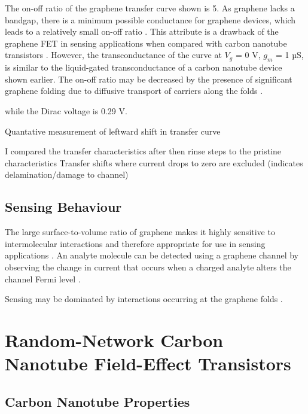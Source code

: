 \documentclass[
  a4paper,
]{scrbook}
\begin{document}
The on-off ratio of the graphene transfer curve shown is 5. As graphene
lacks a bandgap, there is a minimum possible conductance for graphene
devices, which leads to a relatively small on-off ratio
\autocite{Novoselov2004,Geim2007}. This attribute is a drawback of the
graphene FET in sensing applications when compared with carbon nanotube
transistors \autocite{Novoselov2004}. However, the transconductance of
the curve at \(V_g\) = 0 V, \(g_m\) = 1 µS, is similar to the
liquid-gated transconductance of a carbon nanotube device shown earlier.
The on-off ratio may be decreased by the presence of significant
graphene folding due to diffusive transport of carriers along the folds
\autocite{Zhu2012}.

while the Dirac voltage is 0.29 V.

Quantative measurement of leftward shift in transfer curve

I compared the transfer characteristics after then rinse steps to the
pristine characteristics Transfer shifts where current drops to zero are
excluded (indicates delamination/damage to channel)

\hypertarget{sensing-behaviour}{%
\subsection{Sensing Behaviour}\label{sensing-behaviour}}

The large surface-to-volume ratio of graphene makes it highly sensitive
to intermolecular interactions and therefore appropriate for use in
sensing applications \autocite{Ohno2015,Tran2016}. An analyte molecule
can be detected using a graphene channel by observing the change in
current that occurs when a charged analyte alters the channel Fermi
level \autocite{Heller2010,Ohno2015}.

Sensing may be dominated by interactions occurring at the graphene folds
\autocite{Zhao2012}.

\hypertarget{random-network-carbon-nanotube-field-effect-transistors}{%
\section{Random-Network Carbon Nanotube Field-Effect
Transistors}\label{random-network-carbon-nanotube-field-effect-transistors}}

\hypertarget{sec-carbon-nanotubes}{%
\subsection{Carbon Nanotube Properties}\label{sec-carbon-nanotubes}}
\end{document}
